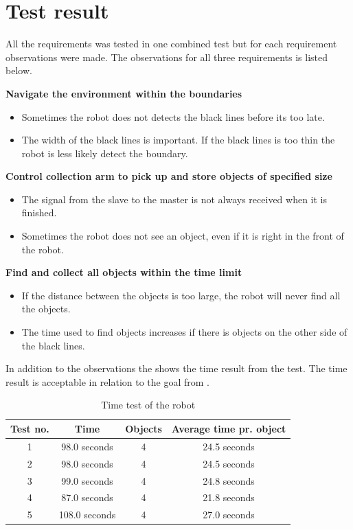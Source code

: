 \section{Test result}

All the requirements was tested in one combined test but for each requirement observations were made. The observations for all three requirements is listed below.

\textbf{Navigate the environment within the boundaries}
\begin{itemize}
\item Sometimes the robot does not detects the black lines before its too late.
\item The width of the black lines is important. If the black lines is too thin the robot is less likely detect the boundary.
\end{itemize}

\textbf{Control collection arm to pick up and store objects of specified size}
\begin{itemize}
\item The signal from the slave to the master is not always received when it is finished.
\item Sometimes the robot does not see an object, even if it is right in the front of the robot.
\end{itemize}

\textbf{Find and collect all objects within the time limit}
\begin{itemize}
\item If the distance between the objects is too large, the robot will never find all the objects. 
\item The time used to find objects increases if there is objects on the other side of the black lines.  
\end{itemize}

In addition to the observations the  shows the time result from the test. The time result is acceptable in relation to the goal from .

\begin{table}[H]
	\centering
   \begin{tabular}{|c|c|c|c|}
   \hline  
   Test no. & Time & Objects & Average time pr. object \\ \hline
      1    & 98.0 seconds    & 4 & 24.5 seconds   \\ \hline
      2    & 98.0 seconds    & 4 & 24.5 seconds  \\ \hline
      3    & 99.0 seconds    & 4 & 24.8 seconds  \\ \hline
      4    & 87.0 seconds    & 4 & 21.8 seconds  \\ \hline
      5    & 108.0 seconds   & 4 & 27.0 seconds  \\ \hline
   \end{tabular}
   \caption{\label{table:FinalTimeTestRobot} Time test of the robot}
\end{table}







